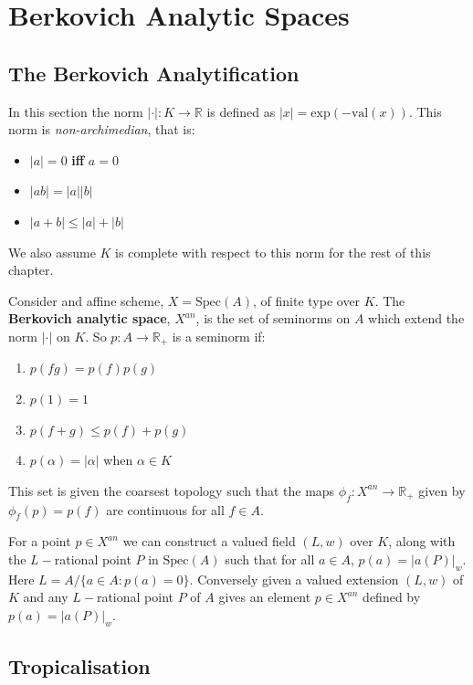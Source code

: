 \section{Berkovich Analytic Spaces}
\subsection{The Berkovich Analytification}
    In this section the norm $|\cdot |:K \to \mathbb{R}$ is defined as $|x| = \text{exp}(-\text{val}(x))$. This norm is \textit{non-archimedian}, that is: 
    \begin{itemize}
        \item $|a| = 0$ \textbf{iff} $a=0$
        \item $|ab| = |a||b|$
        \item $|a+b| \leq |a|+|b|$
    \end{itemize}
    We also assume $K$ is complete with respect to this norm for the rest of this chapter.
    \begin{definition}
        Consider and affine scheme, $X = \text{Spec}(A)$, of finite type over $K$. 
        The \textbf{Berkovich analytic space}, $X^{an}$, is the set of seminorms on $A$ which extend the norm $|\cdot|$ on $K$. 
        So $p:A \to \mathbb{R}_{+}$ is a seminorm if:
        \begin{enumerate}
            \item $p(fg) = p(f)p(g)$
            \item $p(1)=1$
            \item $p(f+g)\leq p(f)+p(g)$
            \item $p(\alpha) = |\alpha|$ when $\alpha \in K$
        \end{enumerate}
        This set is given the coarsest topology such that the maps $\phi_f:X^{an}\to \mathbb{R}_{+}$ given by $\phi_f(p) = p(f)$ are continuous for all $f \in A$.
    \end{definition}
    For a point $p \in X^{an}$ we can construct a valued field $(L,w)$ over $K$, along with the $L-$rational point $P$ in $\text{Spec}(A)$ such that for all $a \in A$, $p(a) = |a(P)|_{w}$. 
    Here $L = A/\{a \in A: p(a)=0\}$. 
    Conversely given a valued extension $(L,w)$ of $K$ and any $L-$rational point $P$ of $A$ gives an element $p \in X^{an}$ defined by $p(a) = |a(P)|_{w}$.
\subsection{Tropicalisation}

